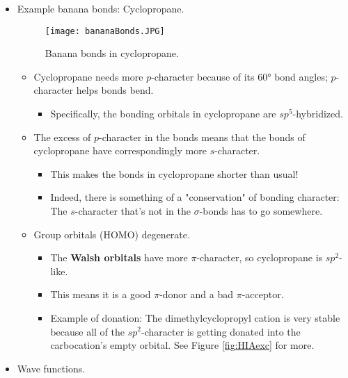 \documentclass[../notes.tex]{subfiles}
\begin{document}
\begin{itemize}
    \begin{itemize}
        \item The bent $p$-lobes of banana bonds look like bananas (see Figure \ref{fig:bananaBonds}), hence the name.
    \end{itemize}
    \item Example banana bonds: Cyclopropane.
    \begin{figure}[h!]
        \centering
        \texttt{[image: bananaBonds.JPG]}
        \caption{Banana bonds in cyclopropane.}
        \label{fig:bananaBonds}
    \end{figure}
    \begin{itemize}
        \item Cyclopropane needs more $p$-character because of its \ang{60} bond angles; $p$-character helps bonds bend.
        \begin{itemize}
            \item Specifically, the  bonding orbitals in cyclopropane are $sp^5$-hybridized.
        \end{itemize}
        \item The excess of $p$-character in the  bonds means that the  bonds of cyclopropane have correspondingly more $s$-character.
        \begin{itemize}
            \item This makes the  bonds in cyclopropane shorter than usual!
            \item Indeed, there is something of a "conservation" of bonding character: The $s$-character that's not in the $\sigma$-bonds has to go somewhere.
        \end{itemize}
        \item Group orbitals (HOMO) degenerate.
        \begin{itemize}
            \item The \textbf{Walsh orbitals} have more $\pi$-character, so cyclopropane is $sp^2$-like.
            \item This means it is a good $\pi$-donor and a bad $\pi$-acceptor.
            \item Example of donation: The dimethylcyclopropyl cation is very stable because all of the $sp^2$-character is getting donated into the carbocation's empty orbital. See Figure \ref{fig:HIAexc} for more.
        \end{itemize}
    \end{itemize}
    \item Wave functions.

\end{itemize}
\end{document}
